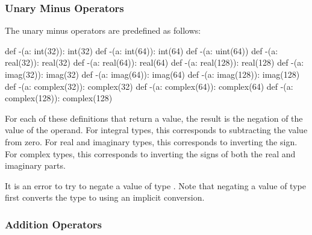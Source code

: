 \subsubsection{Unary Minus Operators}
\label{Unary_Minus_Operators}

The unary minus operators are predefined as follows:
\begin{chapel}
def -(a: int(32)): int(32)
def -(a: int(64)): int(64)
def -(a: uint(64))
def -(a: real(32)): real(32)
def -(a: real(64)): real(64)
def -(a: real(128)): real(128)
def -(a: imag(32)): imag(32)
def -(a: imag(64)): imag(64)
def -(a: imag(128)): imag(128)
def -(a: complex(32)): complex(32)
def -(a: complex(64)): complex(64)
def -(a: complex(128)): complex(128)
\end{chapel}
For each of these definitions that return a value, the result is the
negation of the value of the operand.  For integral types, this
corresponds to subtracting the value from zero.  For real and
imaginary types, this corresponds to inverting the sign.  For complex
types, this corresponds to inverting the signs of both the real and
imaginary parts.

It is an error to try to negate a value of type .  Note
that negating a value of type  first converts the type
to  using an implicit conversion.

\subsubsection{Addition Operators}
\label{Addition_Operators}

